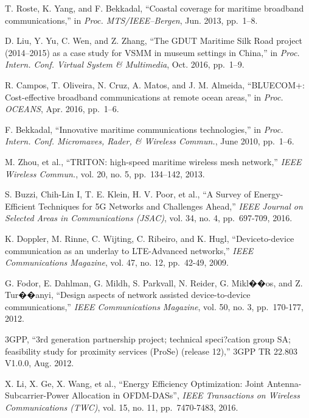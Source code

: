 \documentclass{ieeeaccess}
\begin{document}
\begin{thebibliography}{10}
  
  T. Roste, K. Yang, and F. Bekkadal, ``Coastal coverage for maritime broadband communications,'' in
  \emph{Proc. MTS/IEEE--Bergen}, Jun. 2013, pp.~1--8.
  
  D. Liu, Y. Yu, C. Wen, and Z. Zhang, ``The GDUT Maritime Silk Road project (2014--2015) as a case study for VSMM in museum settings in China,''  in
  \emph{Proc. Intern. Conf. Virtual System \& Multimedia}, Oct. 2016, pp.~1--9.
  
  R. Campos, T. Oliveira, N. Cruz, A. Matos, and J. M. Almeida,
  ``BLUECOM+: Cost-effective broadband communications at remote ocean areas,'' in
  \emph{Proc. OCEANS}, Apr. 2016, pp.~1--6.
  
  F. Bekkadal, ``Innovative maritime communications technologies,'' in
  \emph{Proc. Intern. Conf. Micromaves, Rader, \& Wireless Commun.}, June 2010, pp.~1--6.
  
  M. Zhou, et al., ``TRITON: high-speed maritime wireless mesh network,''
  \emph{IEEE Wireless Commun.}, vol. 20, no. 5, pp.~134--142, 2013.
  
  
  S. Buzzi, Chih-Lin I, T. E. Klein, H. V. Poor, et al., ``A Survey of Energy-Efficient Techniques for 5G Networks and Challenges Ahead,''
  \emph{IEEE Journal on Selected Areas in Communications (JSAC)}, vol. 34, no. 4, pp.~697-709, 2016.
  
  K. Doppler, M. Rinne, C. Wijting, C. Ribeiro, and K. Hugl, ``Deviceto-device communication as an underlay to LTE-Advanced networks,''
    \emph{IEEE Communications Magazine}, vol. 47, no. 12, pp.~42-49, 2009.
   
  G. Fodor, E. Dahlman, G. Mildh, S. Parkvall, N. Reider, G. Mikl��os, and Z. Tur��anyi, ``Design aspects of network assisted device-to-device communications,''
    \emph{IEEE Communications Magazine}, vol. 50, no. 3, pp.~170-177, 2012.
     
   3GPP, ``3rd generation partnership project; technical speci?cation group SA; feasibility study for proximity services (ProSe) (release 12),'' 3GPP TR 22.803 V1.0.0, Aug. 2012.
  
  X. Li, X. Ge, X. Wang, et al., ``Energy Efficiency Optimization: Joint Antenna-Subcarrier-Power Allocation in OFDM-DASs'',
  \emph{IEEE Transactions on Wireless Communications (TWC)}, vol. 15, no. 11, pp.~7470-7483, 2016.
  

\end{thebibliography}
\end{document}
